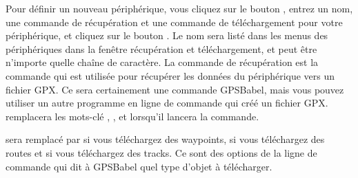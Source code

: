 Pour définir un nouveau périphérique, vous cliquez sur le bouton , entrez un nom, une commande de récupération et
une commande de téléchargement pour votre périphérique, et cliquez sur le bouton .
Le nom sera listé dans les menus des périphériques dans la fenêtre récupération et téléchargement, et peut être n'importe quelle chaîne de caractère.
La commande de récupération est la commande qui est utilisée pour récupérer les données du périphérique vers un fichier GPX.
Ce sera certainement une commande GPSBabel, mais vous pouvez utiliser un autre programme en ligne de commande qui créé un fichier GPX.
\qg remplacera les mots-clé , , et  lorsqu'il lancera la commande.

 sera remplacé par {}  si vous téléchargez des waypoints, {} si vous téléchargez des routes et
{} si vous téléchargez des tracks.
Ce sont des options de la ligne de commande qui dit à GPSBabel quel type d'objet  à télécharger.

